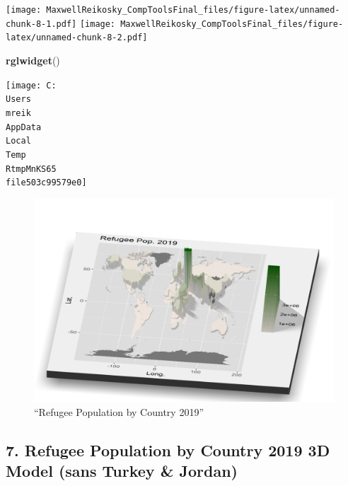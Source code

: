 \documentclass[
]{article}
\newenvironment{Shaded}{\begin{snugshade}}{\end{snugshade}}
\newcommand{\KeywordTok}[1]{\textcolor[rgb]{0.13,0.29,0.53}{\textbf{#1}}}
\newcommand{\NormalTok}[1]{#1}
\begin{document}
\texttt{[image: MaxwellReikosky\_CompToolsFinal\_files/figure-latex/unnamed-chunk-8-1.pdf]}
\texttt{[image: MaxwellReikosky\_CompToolsFinal\_files/figure-latex/unnamed-chunk-8-2.pdf]}

\begin{Shaded}
\begin{Highlighting}[]
\KeywordTok{rglwidget}\NormalTok{()}
\end{Highlighting}
\end{Shaded}

\texttt{[image: C:\\Users\\mreik\\AppData\\Local\\Temp\\RtmpMnKS65\\file503c99579e0]}

\begin{figure}
\centering
\includegraphics{Results/refpop.png}
\caption{``Refugee Population by Country 2019''}
\end{figure}

\hypertarget{refugee-population-by-country-2019-3d-model-sans-turkey-jordan}{%
\subsection{7. Refugee Population by Country 2019 3D Model (sans Turkey
\&
Jordan)}\label{refugee-population-by-country-2019-3d-model-sans-turkey-jordan}}
\end{document}
